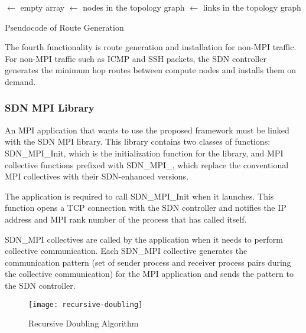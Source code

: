 \begin{algorithm}

    \Routes $\gets$ empty array\;
    \Nodes $\gets$ nodes in the topology graph\;
    \Links $\gets$ links in the topology graph\;


    \caption{Pseudocode of Route Generation}%
    \label{lst:code-generate-route}
\end{algorithm}

The fourth functionality is route generation and installation for
non-MPI traffic. For non-MPI traffic such as ICMP and SSH packets, the
SDN controller generates the minimum hop routes between compute nodes
and installs them on demand.

\subsubsection{SDN MPI Library}

An MPI application that wants to use the proposed framework must be linked
with the SDN MPI library. This library contains two classes of functions:
SDN\_MPI\_Init, which is the initialization function for the library, and
MPI collective functions prefixed with SDN\_MPI\_, which replace the
conventional MPI collectives with their SDN-enhanced versions.

The application is required to call SDN\_MPI\_Init when it launches. This
function opens a TCP connection with the SDN controller and notifies the IP
address and MPI rank number of the process that has called itself.

SDN\_MPI collectives are called by the application when it needs to perform
collective communication. Each SDN\_MPI collective generates the communication
pattern (set of sender process and receiver process pairs during the
collective communication) for the MPI application and sends the pattern to the
SDN controller.

\begin{figure}
    \centering
    \texttt{[image: recursive-doubling]}
    \caption{Recursive Doubling Algorithm}%
    \label{fig:recursive-doubling}
\end{figure}

